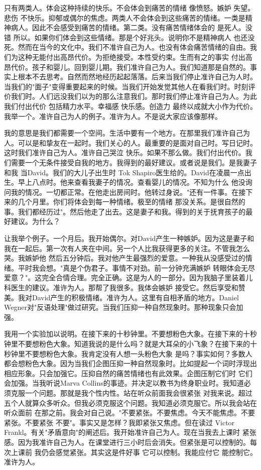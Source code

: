 只有两类人。体会这种持续的快乐。不会体会到痛苦的情绪 像愤怒。嫉妒 失望。悲伤 不快乐。抑郁或偶尔的焦虑。两类人不会体会到这些痛苦的情绪。一类是精神病人。因此不会感受到痛苦的情绪。第二类。没有痛苦情绪体会的 是死人。没错 所以。如果你们体会到这些情绪。那是个好兆头。说明你不是精神病人 也还没死。然而在当今的文化中。我们不准许自己为人。也没有体会痛苦情绪的自由。我们为这种无能付出高昂代价。为拒绝接受。本性受约束。生而有之的事实 付出高昂代价。孩子和婴儿。回到婴儿期。我们准许自己为人。我们知道那是自然的。事实上根本不去思考。自然而然地经历起起落落。后来当我们停止准许自己为人时。当我们的"面子"变得重要起来的时候。当我们开始发觉其他人在看我们时。时刻评价我们时。人们远没我们以为的那么注意我们。那时我们停止准许自己为人。为此我们付出代价 包括精力水平。幸福感 快乐感。创造力 最终以成就大小作为代价。我举一个。准许自己为人的例子。准许为人。不是说大家应该像那样。 

我的意思是我们都需要一个空间。生活中要有一个地方。在那里我们准许自己为人。可以是和挚友在一起时。我们关心的人。最重要的是面对自己时。写日记时。这时我们准许自己为人。准许自己哭泣 快乐。如果不那么做。我们付出代价。我们需要一个无条件接受自我的地方。我得到的最好建议。或者说是我们。是我妻子和我 当David。我们的大儿子出生时 Tok Shapiro医生给的。David在凌晨一点出生。早上八点时。他来查看我妻子的情况。查看婴儿的情况。不知为什么 他没询问我的情况。一切都正常。在他走出房间时。他转过身说。"还有一件事。在接下来的几个月里。你们将体会到每一种情绪。极至的情绪 那没关系。是很自然的事。我们都经历过"。然后他走了出去。这是妻子和我。得到的关于抚育孩子的最好建议。为什么？ 

让我举个例子。一个月后。我开始偶尔。对David产生一种嫉妒。因为这是妻子和我在一起后。第一次有人夹在中间。另一个人比我获得更多的关注。不管我怎么哭。我嫉妒他 然后五分钟后。我对他产生最强烈的爱意。一种我从没感受过的情绪。平时我会想。"真是个伪君子。事情不对劲。前一分钟充满嫉妒 转眼体会无尽爱意？"。这完全合情合理。完全正确。这是为人的一部分。因为我脑子里装着儿科医生的建议。准许为人。那帮了我很多。我体会嫉妒 接受它。然后享受和赞美。我对David产生的积极情绪。准许为人。这里有自相矛盾的地方。Daniel Wegner对"反语处理"做过研究。当我们压抑一种自然现象时。那种现象只会加强。 

我用一个实验加以说明。在接下来的十秒钟里。不要想粉色大象。在接下来的十秒钟里不要想粉色大象。知道我说的是什么吗？就是大耳朵的小飞象？在接下来的十秒钟里不要想粉色大象。我肯定没有人想一头粉色大象 是吗？事实如何？多数人都会想粉色大象。因为当我们企图压抑一种自然现象时。比如提起一个词时浮现出相应形象。只会加强它。压抑自然的痛苦情绪也有此效果。企图压制它们时 它们会加强。当我听说Marva Collins的事迹。并决定以教书为终身职业时。我知道必须克服一个问题。那就是我个性内性。站在听众前面我会很紧张 对我来说。超过五个人就算众多听众。但我必须克服这个问题。我知道必须克服它。所以我会站在听众面前 在那之前。我会对自己说。"不要紧张。不要焦虑。今天不能焦虑。不要紧张。不要紧张 不要"。事实又是怎样？我即紧张又焦虑。但在读过 Victor Frankl。有关"矛盾意向"的阐述后。我开始准许自己为人。现在当我去上课时 紧张感。因为我准许自己为人。在课堂进行三小时后会消失。但紧张是可以控制的。每次上课前 我仍会感觉紧张。其实这是件好事 它可以控制。我能应付它 能控制它。准许为人。 

